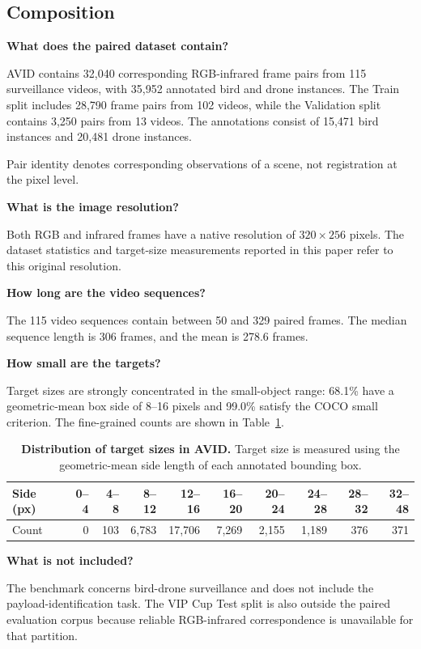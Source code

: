 \documentclass[10pt]{article}
\newcommand{\dataset}{\textsc{AVID}}
\begin{document}
\subsection{Composition}

\textbf{What does the paired dataset contain?}

\dataset{} contains 32,040 corresponding RGB-infrared frame pairs from 115 surveillance videos, with 35,952 annotated bird and drone instances. The Train split includes 28,790 frame pairs from 102 videos, while the Validation split contains 3,250 pairs from 13 videos. The annotations consist of 15,471 bird instances and 20,481 drone instances.

Pair identity denotes corresponding observations of a scene, not registration at the pixel level.

\textbf{What is the image resolution?}

Both RGB and infrared frames have a native resolution of $320\times256$ pixels. The dataset statistics and target-size measurements reported in this paper refer to this original resolution.

\textbf{How long are the video sequences?}

The 115 video sequences contain between 50 and 329 paired frames. The median sequence length is 306 frames, and the mean is 278.6 frames.

\textbf{How small are the targets?}

Target sizes are strongly concentrated in the small-object range: 68.1\% have a geometric-mean box side of 8--16 pixels and 99.0\% satisfy the COCO small criterion. The fine-grained counts are shown in Table~\ref{tab:scalehist}.

\begin{table}[h]
\centering
\caption{\textbf{Distribution of target sizes in \dataset{}.}
Target size is measured using the geometric-mean side length of each annotated bounding box.}
\label{tab:scalehist}
\small
\begin{tabular}{lrrrrrrrrr}
\toprule
Side (px)
& 0--4 & 4--8 & 8--12 & 12--16 & 16--20
& 20--24 & 24--28 & 28--32 & 32--48 \\
\midrule
Count
& 0 & 103 & 6,783 & 17,706 & 7,269
& 2,155 & 1,189 & 376 & 371 \\
\bottomrule
\end{tabular}
\end{table}

\textbf{What is not included?}

The benchmark concerns bird-drone surveillance and does not include the payload-identification task. The VIP Cup Test split is also outside the paired evaluation corpus because reliable RGB-infrared correspondence is unavailable for that partition.
\end{document}
